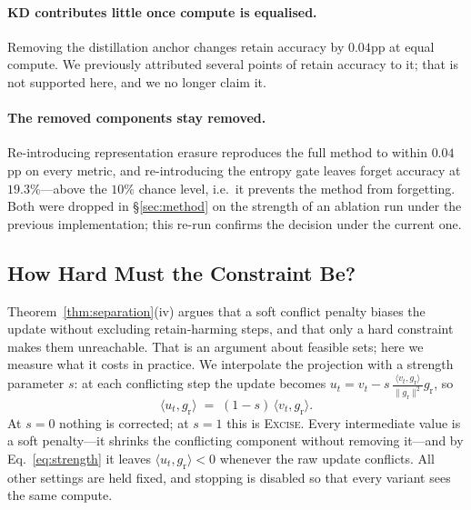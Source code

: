 \documentclass{article}
\newcommand{\ours}{\textsc{Excise}}
\newcommand{\gr}{g_{\mathrm{r}}}
\theoremstyle{remark}
\theoremstyle{plain}
\begin{document}
\paragraph{KD contributes little once compute is equalised.}
Removing the distillation anchor changes retain accuracy by $0.04$pp at equal
compute. We previously attributed several points of retain accuracy to it; that
is not supported here, and we no longer claim it.

\paragraph{The removed components stay removed.}
Re-introducing representation erasure reproduces the full method to within
$0.04$pp on every metric, and re-introducing the entropy gate leaves forget
accuracy at $19.3\%$---above the $10\%$ chance level, i.e.\ it prevents the
method from forgetting. Both were dropped in \S\ref{sec:method} on the strength
of an ablation run under the previous implementation; this re-run confirms the
decision under the current one.

\subsection{How Hard Must the Constraint Be?}\label{sec:strength}

Theorem~\ref{thm:separation}(iv) argues that a soft conflict penalty biases the
update without excluding retain-harming steps, and that only a hard constraint
makes them unreachable. That is an argument about feasible sets; here we measure
what it costs in practice. We interpolate the projection with a strength
parameter $s$: at each conflicting step the update becomes
$u_t = v_t - s\,\frac{\langle v_t,\gr\rangle}{\|\gr\|^2}\gr$, so
\begin{equation}\label{eq:strength}
\langle u_t, \gr\rangle \;=\; (1-s)\,\langle v_t, \gr\rangle .
\end{equation}
At $s=0$ nothing is corrected; at $s=1$ this is \ours{}. Every intermediate
value is a soft penalty---it shrinks the conflicting component without removing
it---and by Eq.~\ref{eq:strength} it leaves $\langle u_t,\gr\rangle<0$ whenever
the raw update conflicts. All other settings are held fixed, and stopping is
disabled so that every variant sees the same compute.
\end{document}
